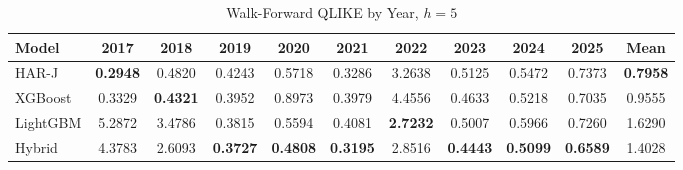 \begin{table}[htbp]
\centering
\caption{Walk-Forward QLIKE by Year, $h=5$}
\label{tab:wf_qlike_h5}
\begin{tabular}{lcccccccccc}
\hline
Model & 2017 & 2018 & 2019 & 2020 & 2021 & 2022 & 2023 & 2024 & 2025 & Mean \\
\hline
HAR-J & \textbf{0.2948} & 0.4820 & 0.4243 & 0.5718 & 0.3286 & 3.2638 & 0.5125 & 0.5472 & 0.7373 & \textbf{0.7958} \\
XGBoost & 0.3329 & \textbf{0.4321} & 0.3952 & 0.8973 & 0.3979 & 4.4556 & 0.4633 & 0.5218 & 0.7035 & 0.9555 \\
LightGBM & 5.2872 & 3.4786 & 0.3815 & 0.5594 & 0.4081 & \textbf{2.7232} & 0.5007 & 0.5966 & 0.7260 & 1.6290 \\
Hybrid & 4.3783 & 2.6093 & \textbf{0.3727} & \textbf{0.4808} & \textbf{0.3195} & 2.8516 & \textbf{0.4443} & \textbf{0.5099} & \textbf{0.6589} & 1.4028 \\
\hline
\end{tabular}
\end{table}
